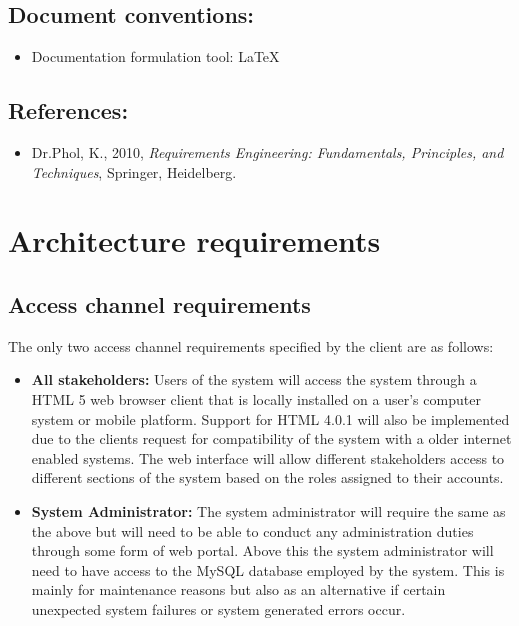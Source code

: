 \documentclass[12pt]{article}
\begin{document}
\vspace{0.5in}

\subsection{Document conventions:}
\vspace{0.1in}
\begin{itemize}
\item Documentation formulation tool: LaTeX

\end{itemize}

\vspace{0.2in}

\subsection{References:}
\vspace{0.1in}
\begin{itemize}
\item Dr.Phol, K., 2010, \textit{Requirements Engineering: Fundamentals, Principles, and Techniques}, Springer, Heidelberg.
\end{itemize}	

\vspace{0.5in}

\newpage
\section{Architecture requirements}
\subsection{Access channel requirements} %
\vspace{0.2in}
The only two access channel requirements specified by the client are as follows:
\begin{itemize}


\item \textbf{All stakeholders:}
Users of the system will access the system through a HTML 5 web browser client that is locally installed on a user's computer system or mobile platform. Support for HTML 4.0.1 will also be implemented due to the clients request for compatibility of the system with a older internet enabled systems. The web interface will allow different stakeholders access to different sections of the system based on the roles assigned to their accounts. 

\item\textbf{System Administrator:}
The system administrator will require the same as the above but will need to be able to conduct any administration duties through some form of web portal. Above this the system administrator will need to have access to the MySQL database employed by the system. This is mainly for maintenance reasons but also as an alternative if certain unexpected system failures or system generated errors occur.

\end{itemize}
\vspace{0.2in}
\end{document}
